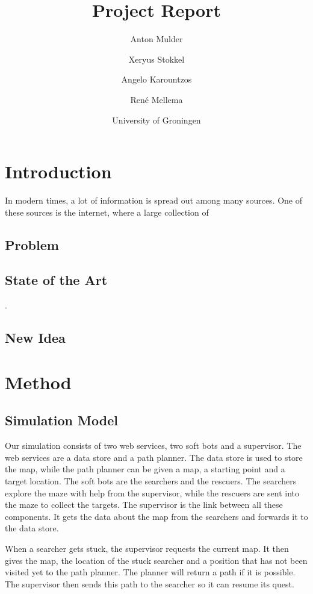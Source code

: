 \documentclass{article}
\title{\textbf{\huge Project Report}}
\author{Anton Mulder \and Xeryus Stokkel \and Angelo Karountzos \and Ren\'e
    Mellema}
\date{University of Groningen}
\begin{document}
\maketitle

\begin{abstract}
    \noindent
\end{abstract}

\section{Introduction}
In modern times, a lot of information is spread out among many sources.
One of these sources is the internet, where a large collection of 
\subsection{Problem}
\subsection{State of the Art}
\cite{intframe}.
\subsection{New Idea}

\section{Method}
\subsection{Simulation Model}
Our simulation consists of two web services, two soft bots and a supervisor.
The web services are a data store and a path planner. The data store is used
to store the map, while the path planner can be given a map, a starting
point and a target location. The soft bots are the searchers and the
rescuers. The searchers explore the maze with help from the supervisor,
while the rescuers are sent into the maze to collect the targets. The
supervisor is the link between all these components. It gets the data about
the map from the searchers and forwards it to the data store. 

When a searcher gets stuck, the supervisor requests the current map. It
then gives the map, the location of the stuck searcher and a position that
has not been visited yet to the path planner. The planner will return a
path if it is possible. The supervisor then sends this path to the searcher
so it can resume its quest.
\end{document}

